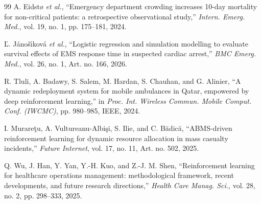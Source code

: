 \documentclass[conference]{IEEEtran}
\begin{document}
\begin{thebibliography}{99}
A. Eidst{\o} \emph{et al.}, ``Emergency department crowding increases 10-day mortality for non-critical patients: a retrospective observational study,'' \emph{Intern. Emerg. Med.}, vol. 19, no. 1, pp. 175--181, 2024.

{\v L}. J{\'a}no{\v s}{\'\i}kov{\'a} \emph{et al.}, ``Logistic regression and simulation modelling to evaluate survival effects of EMS response time in suspected cardiac arrest,'' \emph{BMC Emerg. Med.}, vol. 26, no. 1, Art. no. 166, 2026.

R. Tluli, A. Badawy, S. Salem, M. Hardan, S. Chauhan, and G. Alinier, ``A dynamic redeployment system for mobile ambulances in Qatar, empowered by deep reinforcement learning,'' in \emph{Proc. Int. Wireless Commun. Mobile Comput. Conf. (IWCMC)}, pp. 980--985, IEEE, 2024.

I. Murare{\c t}u, A. Vultureanu-Albi{\c s}i, S. Ilie, and C. B{\u a}dic{\u a}, ``ABMS-driven reinforcement learning for dynamic resource allocation in mass casualty incidents,'' \emph{Future Internet}, vol. 17, no. 11, Art. no. 502, 2025.

Q. Wu, J. Han, Y. Yan, Y.-H. Kuo, and Z.-J. M. Shen, ``Reinforcement learning for healthcare operations management: methodological framework, recent developments, and future research directions,'' \emph{Health Care Manag. Sci.}, vol. 28, no. 2, pp. 298--333, 2025.
\end{thebibliography}
\end{document}
